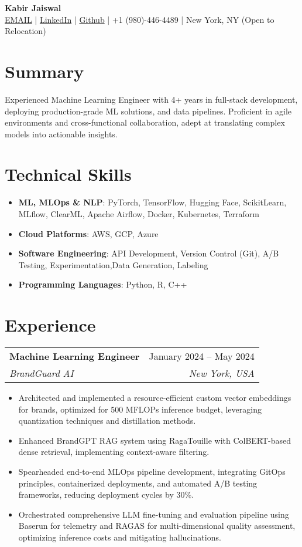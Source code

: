 \documentclass[10pt,letterpaper]{article}
\makeatletter
\newcommand{\resumeItem}[2]{
  \item\small{
    \textbf{#1}{: #2 \vspace{-4pt}}
  }
}
\newcommand{\resumeSubheading}[4]{
  \vspace{-5pt}
    \begin{tabular*}{0.97\textwidth}{l@{\extracolsep{\fill}}r}
      \textbf{#1} & #2 \\
      \textit{\small#3} & \textit{\small #4} \\
    \end{tabular*}\vspace{-4pt}
}
\newcommand{\resumeSubHeadingListStart}{\begin{itemize}[leftmargin=*]}
\newcommand{\resumeSubHeadingListEnd}{\end{itemize}}
\newcommand{\resumeItemListStart}{\begin{itemize}}
\newcommand{\resumeItemListEnd}{\end{itemize}}
\makeatother
\begin{document}
\begin{center}
  \textbf{\Large Kabir Jaiswal} \\

  \href{mailto:kabirjaiswal900@gmail.com}{EMAIL} |
  \href{https://www.linkedin.com/in/kabir-j}{LinkedIn} |
  \href{https://github.com/kabir12345}{Github} |
  +1 (980)-446-4489 |
  New York, NY (Open to Relocation)
\end{center}

\section{Summary}
Experienced Machine Learning Engineer with 4+ years in full-stack development, deploying production-grade ML solutions, and data pipelines.
Proficient in agile environments and cross-functional collaboration, adept at translating complex models into actionable insights.

\section{Technical Skills}
\resumeSubHeadingListStart
    \resumeItem{ML, MLOps \& NLP}{PyTorch, TensorFlow, Hugging Face, ScikitLearn, MLflow, ClearML, Apache Airflow, Docker, Kubernetes, Terraform}
    \resumeItem{Cloud Platforms}{AWS, GCP, Azure}
    \resumeItem{Software Engineering}{API Development, Version Control (Git), A/B Testing, Experimentation,Data Generation, Labeling}
    \resumeItem{Programming Languages}{Python, R, C++}
\resumeSubHeadingListEnd

\section{Experience}
\vspace{1pt}
\resumeSubheading
  {Machine Learning Engineer}{January 2024 – May 2024}
  {BrandGuard AI}{New York, USA}
\resumeItemListStart
    \item Architected and implemented a resource-efficient custom vector embeddings for brands, optimized for 500 MFLOPs inference budget, leveraging quantization techniques and distillation methods.
    \item Enhanced BrandGPT RAG system using RagaTouille  with ColBERT-based dense retrieval, implementing context-aware filtering.
    \item Spearheaded end-to-end MLOps pipeline development, integrating GitOps principles, containerized deployments, and automated A/B testing frameworks, reducing deployment cycles by 30\%.
    \item Orchestrated comprehensive LLM fine-tuning and evaluation pipeline using Baserun for telemetry and RAGAS for multi-dimensional quality assessment, optimizing inference costs and mitigating hallucinations.
\resumeItemListEnd
\end{document}
